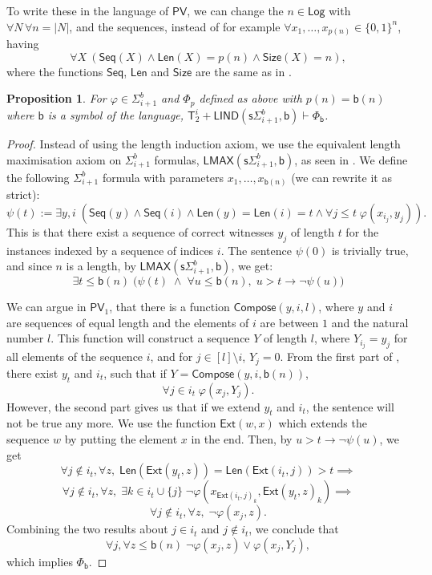 \documentclass[11pt]{article}
\newcommand{\PV}{\mathsf{PV}}
\newcommand{\bd}{\mathsf{b}}
\newcommand{\abs}[1]{\lvert #1 \rvert}
\newtheorem{proposition}[theorem]{Proposition}
\theoremstyle{definition}
\theoremstyle{definition}
\theoremstyle{remark}
\begin{document}
To write these in the language of $\PV$, we can change the $n\in \mathsf{Log}$ with $\forall N\,\forall n=\abs{N}$, and the sequences, instead of for example $\forall x_1,\dots,x_{p(n)}\in \{0,1\}^n$, having $$\forall X\: \left(\mathsf{Seq}(X)\land \mathsf{Len}(X)=p(n)\land \mathsf{Size}(X)=n\right),$$
where the functions $\mathsf{Seq}$, $\mathsf{Len}$ and $\mathsf{Size}$ are the same as in .

\begin{proposition}\label{prop:phi}
    For $\varphi\in \Sigma^b_{i+1}$  and $\Phi_{p}$ defined as above with $p(n)=\bd(n)$ where $\bd$ is a symbol of the language, $\mathsf{T}^i_2+\mathsf{LIND}(\mathsf{s}\Sigma^b_{i+1},\bd)\vdash \Phi_{\bd}$.
\end{proposition}

\begin{proof}
Instead of using the length induction axiom, we use the equivalent length maximisation axiom on $\Sigma^b_{i+1}$ formulas, $\mathsf{LMAX}(\mathsf{s}\Sigma^b_{i+1},\bd)$, as seen in . We define the following $\Sigma^b_{i+1}$ formula with parameters $x_1,\dots,x_{\bd(n)}$ (we can rewrite it as strict):
$$
\psi(t):=\exists y,i \;(\mathsf{Seq}(y) \land \mathsf{Seq}(i) \land \mathsf{Len}(y)=\mathsf{Len}(i)=t\land\forall j\leq t\; \varphi(x_{i_j},y_j)).
$$
This is that there exist a sequence of correct witnesses $y_j$ of length $t$ for the instances indexed by a sequence of indices $i$. The sentence $\psi(0)$ is trivially true, and since $n$ is a length, by $\mathsf{LMAX}(\mathsf{s}\Sigma^b_{i+1},\bd)$, we get:
\begin{equation}\label{eq:maximisation}
   \exists t \leq \bd(n) \;\big(\psi(t)\;\land\; \forall u\leq \bd(n), \; u>t\rightarrow \neg\psi(u)\big)
\end{equation}

We can argue in $\PV_1$, that there is a function $\mathsf{Compose}(y,i,l)$, where $y$ and $i$ are sequences of equal length and the elements of $i$ are between $1$ and the natural number $l$. This function will construct a sequence $Y$ of length $l$, where $Y_{i_j}=y_j$ for all elements of the sequence $i$, and for $j\in [l]\setminus i$, $Y_j=0$. From the first part of , there exist $y_t$ and $i_t$, such that if $Y=\mathsf{Compose}(y,i,\bd(n))$,
$$
\forall j\in i_t\;\varphi(x_j,Y_j).
$$
However, the second part gives us that if we extend $y_t$ and $i_t$, the sentence will not be true any more. We use the function $\mathsf{Ext}(w,x)$ which extends the sequence $w$ by putting the element $x$ in the end. Then, by $u>t\rightarrow\neg \psi(u)$, we get
$$
\forall j\not\in i_t,\forall z,\; \mathsf{Len}(\mathsf{Ext}(y_t,z))=\mathsf{Len}(\mathsf{Ext}(i_t,j))>t\implies $$
$$\forall j\not\in i_t,\forall z,\; \exists k\in i_t\cup\{j\}\;  \neg \varphi(x_{\mathsf{Ext}(i_t,j)_k},\mathsf{Ext}(y_t,z)_k) \implies $$
$$\forall j\not\in i_t,\forall z,\; \neg\varphi(x_j,z).
$$
Combining the two results about $j\in i_t$ and $j\not \in i_t$, we conclude that 
$$
\forall j,\forall z\leq \bd(n) \; \neg\varphi(x_j,z) \lor \varphi(x_j,Y_j),
$$
which implies $\Phi_\bd$.
\end{proof}
\end{document}
